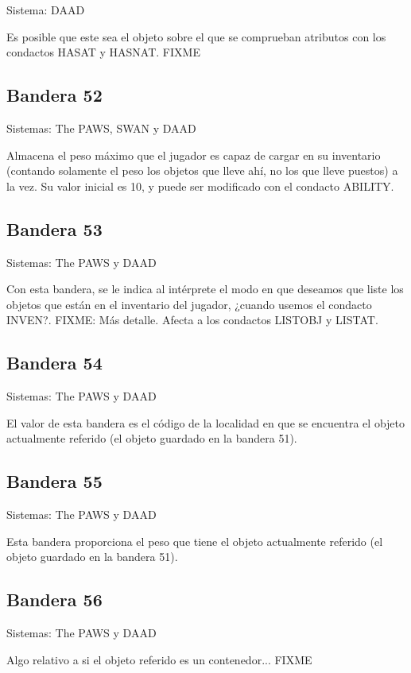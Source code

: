 \documentclass[11pt, a5paper]{article}
\newcommand{\paw}{\textsf{The PAWS}\xspace}
\newcommand{\swan}{\textsf{SWAN}\xspace}
\newcommand{\daad}{\textsf{DAAD}\xspace}
\newcommand{\sistema}[1]{\noindent Sistema: #1 \nopagebreak}
\newcommand{\sistemas}[1]{\noindent Sistemas: #1 \nopagebreak}
\begin{document}
\sistema{\daad}

Es posible que este sea el objeto sobre el que se comprueban atributos con los condactos HASAT y HASNAT. FIXME

\subsection{Bandera 52}

\sistemas{\paw, \swan y \daad}

Almacena el peso máximo que el jugador es capaz de cargar en su inventario (contando solamente el peso los objetos que lleve ahí, no los que lleve puestos) a la vez. Su valor inicial es 10, y puede ser modificado con el condacto ABILITY.

\subsection{Bandera 53}

\sistemas{\paw y \daad}

Con esta bandera, se le indica al intérprete el modo en que deseamos que liste los objetos que están en el inventario del jugador, ¿cuando usemos el condacto INVEN?. FIXME: Más detalle. Afecta a los condactos LISTOBJ y LISTAT.

\subsection{Bandera 54}

\sistemas{\paw y \daad}

El valor de esta bandera es el código de la localidad en que se encuentra el objeto actualmente referido (el objeto guardado en la bandera 51).

\subsection{Bandera 55}

\sistemas{\paw y \daad}

Esta bandera proporciona el peso que tiene el objeto actualmente referido (el objeto guardado en la bandera 51).

\subsection{Bandera 56}

\sistemas{\paw y \daad}

Algo relativo a si el objeto referido es un contenedor... FIXME
\end{document}

